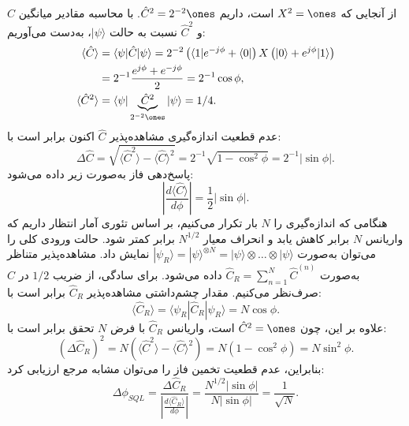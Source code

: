 از آنجایی که $X^2 = \ones$ است، داریم $\hat{C}^2 = 2^{-2}\ones$. با محاسبه مقادیر میانگین $\hat{C}$ و $\hat{C}^2$ نسبت به حالت $|\psi\rangle$، به‌دست می‌آوریم:
\begin{equation}
	\begin{aligned}
		\langle \hat{C} \rangle &= \langle \psi | \hat{C} | \psi \rangle = 2^{-2} \left( \langle 1| e^{-j\phi} + \langle 0| \right) X \left( |0\rangle + e^{j\phi}|1\rangle \right) \\
		&= 2^{-1} \frac{e^{j\phi} + e^{-j\phi}}{2} = 2^{-1} \cos \phi, \\
		\langle \hat{C}^2 \rangle &= \langle \psi | \underbrace{\hat{C}^2}_{2^{-2}\ones} | \psi \rangle = 1/4.
		\label{eq:11-24}
	\end{aligned}
\end{equation}
عدم قطعیت اندازه‌گیری مشاهده‌پذیر $\hat{C}$ اکنون برابر است با:
\begin{equation}
	\Delta \hat{C} = \sqrt{\langle \hat{C}^2 \rangle - \langle \hat{C} \rangle^2} = 2^{-1} \sqrt{1 - \cos^2 \phi} = 2^{-1} |\sin \phi|.
	\label{eq:11-25}
\end{equation}
پاسخ‌دهی فاز به‌صورت زیر داده می‌شود:
\begin{equation}
	\left| \frac{d\langle \hat{C} \rangle}{d\phi} \right| = \frac{1}{2} |\sin \phi|.
	\label{eq:11-26}
\end{equation}
هنگامی که اندازه‌گیری را $N$ بار تکرار می‌کنیم، بر اساس تئوری آمار انتظار داریم که واریانس $N$ برابر کاهش یابد و انحراف معیار $N^{1/2}$ برابر کمتر شود. حالت ورودی کلی را می‌توان به‌صورت $|\psi_R\rangle = |\psi\rangle^{\otimes N} = |\psi\rangle \otimes \dots \otimes |\psi\rangle$ نمایش داد. مشاهده‌پذیر متناظر به‌صورت $\hat{C}_R = \sum_{n=1}^N \hat{C}^{(n)}$ داده می‌شود. برای سادگی، از ضریب $1/2$ در $\hat{C}$ صرف‌نظر می‌کنیم. مقدار چشم‌داشتی مشاهده‌پذیر $\hat{C}_R$ برابر است با:
\begin{equation}
	\langle \hat{C}_R \rangle = \langle \psi_R | \hat{C}_R | \psi_R \rangle = N \cos \phi.
	\label{eq:11-27}
\end{equation}
علاوه بر این، چون $\hat{C}^2 = \ones$ است، واریانس $\hat{C}_R$ با فرض $N$ تحقق برابر است با:
\begin{equation}
	(\Delta \hat{C}_R)^2 = N (\langle \hat{C}^2 \rangle - \langle \hat{C} \rangle^2) = N (1 - \cos^2 \phi) = N \sin^2 \phi.
	\label{eq:11-28}
\end{equation}
بنابراین، عدم قطعیت تخمین فاز را می‌توان مشابه مرجع \cite{6} ارزیابی کرد:
\begin{equation}
	\Delta \phi_{SQL} = \frac{\Delta \hat{C}_R}{\left| \frac{d\langle \hat{C}_R \rangle}{d\phi} \right|} = \frac{N^{1/2} |\sin \phi|}{N |\sin \phi|} = \frac{1}{\sqrt{N}}.
	\label{eq:11-29}
\end{equation}

